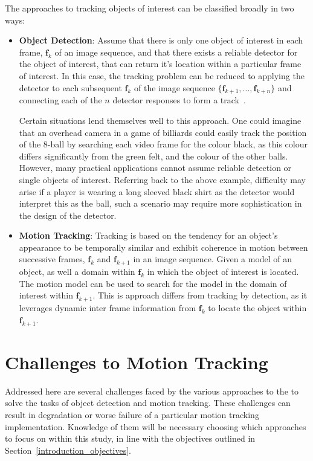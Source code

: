 The approaches to tracking objects of interest can be classified broadly in two ways:
\begin{itemize}
    \item \textbf{Object Detection}: Assume that there is only one object
        of interest in each frame, $\mathbf{f}_k$ of an image sequence, and that
        there exists a reliable detector for the object of interest, that can
        return it's location within a particular frame of interest. In this case, the
        tracking problem can be reduced to applying the detector to each
        subsequent $\mathbf{f}_k$ of the image sequence
        $\{\mathbf{f}_{k+1},\ldots,\mathbf{f}_{k+n}\}$ and connecting each of the
        $n$ detector responses to form a track~\cite{Forsyth2012}.

        Certain situations lend themselves well to this approach. One could
        imagine that an overhead camera in a game of billiards could easily track the
        position of the 8-ball by searching each video frame for the colour black, as
        this colour differs significantly from the green felt, and the colour of the
        other balls. However, many practical applications cannot assume reliable
        detection or single objects of interest. Referring back to the above example,
        difficulty may arise if a player is wearing a long sleeved black shirt as the
        detector would interpret this as the ball, such a scenario may require more
        sophistication in the design of the detector.

    \item \textbf{Motion Tracking}: Tracking is based on the tendency for an object's
        appearance to be temporally similar and exhibit coherence in motion
        between successive frames, $\mathbf{f}_k$ and $\mathbf{f}_{k+1}$ in an
        image sequence. Given a model of an object, as well a domain within
        $\mathbf{f}_k$ in which the object of interest is located. The motion
        model can be used to search for the model in the domain of interest
        within $\mathbf{f}_{k+1}$.  This is approach differs from tracking by
        detection, as it leverages dynamic inter frame information from
        $\mathbf{f}_k$ to locate the object within $\mathbf{f}_{k+1}$.
\end{itemize}

\section{Challenges to Motion Tracking}\label{literature_review_challenges}
Addressed here are several challenges faced by the various approaches to the to
solve the tasks of object detection and motion tracking. These challenges can
result in degradation or worse failure of a particular motion tracking
implementation. Knowledge of them will be necessary choosing which
approaches to focus on within this study, in line with the objectives outlined
in Section~\ref{introduction_objectives}. 

